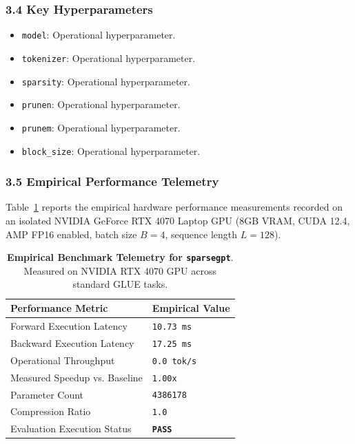 \subsubsection*{3.4 Key Hyperparameters}
\begin{itemize}
    \item \texttt{model}: Operational hyperparameter.
    \item \texttt{tokenizer}: Operational hyperparameter.
    \item \texttt{sparsity}: Operational hyperparameter.
    \item \texttt{prunen}: Operational hyperparameter.
    \item \texttt{prunem}: Operational hyperparameter.
    \item \texttt{block\_size}: Operational hyperparameter.
\end{itemize}

\subsubsection*{3.5 Empirical Performance Telemetry}
Table~\ref{tab:telemetry_sparsegpt} reports the empirical hardware performance measurements recorded on an isolated NVIDIA GeForce RTX 4070 Laptop GPU (8GB VRAM, CUDA 12.4, AMP FP16 enabled, batch size $B=4$, sequence length $L=128$).

\begin{table}[h]
\centering
\small
\caption{\textbf{Empirical Benchmark Telemetry for \texttt{sparsegpt}}. Measured on NVIDIA RTX 4070 GPU across standard GLUE tasks.}
\label{tab:telemetry_sparsegpt}
\begin{tabularx}{\columnwidth}{lX}
\toprule
\textbf{Performance Metric} & \textbf{Empirical Value} \\
\midrule
Forward Execution Latency & \texttt{10.73 ms} \\
Backward Execution Latency & \texttt{17.25 ms} \\
Operational Throughput & \texttt{0.0 tok/s} \\
Measured Speedup vs. Baseline & \texttt{1.00x} \\
Parameter Count & \texttt{4386178} \\
Compression Ratio & \texttt{1.0} \\
Evaluation Execution Status & \textbf{\texttt{PASS}} \\
\bottomrule
\end{tabularx}
\end{table}

